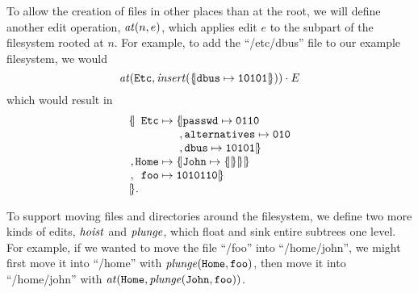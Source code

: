 To allow the creation of files in other places than at the root, we will
define another edit operation, $\mathit{at}(n,e)$, which applies edit $e$ to the
subpart of the filesystem rooted at $n$. For example, to add the
``/etc/dbus'' file to our example filesystem, we would
\[\mathit{at}(\mathtt{Etc},\mathit{insert}(\{\hspace{-2pt}|\mathtt{dbus}\mapsto\mathtt{10101}|\hspace{-2pt}\}))\cdot
E\]
which would result in
\[
\begin{array}{c@{}r@{\;}l@{\;}l}
    \Open&\Label{Etc} &\To&\Open\Label{passwd}\To\Label{0110} \\
         &            &   &\;,  \Label{alternatives}\To\Label{010} \\
         &            &   &\;,  \Label{dbus}\To\Label{10101}\Close \\
    ,    &\Label{Home}&\To&\Open\Label{John}\To\Open\Close\Close\Close \\
    ,    &\Label{foo} &\To&\Label{1010110}\Close \\
    \Close.\!\!
\end{array}
\]

To support moving files and directories around the filesystem, we
define two more kinds of edits, $\mathit{hoist}$ and $\mathit{plunge}$, which float and sink
entire subtrees one level. For example, if we wanted to move the file
``/foo'' into ``/home/john'', we might first move it into ``/home'' with
$\mathit{plunge}(\mathtt{Home},\mathtt{foo})$, then move it into ``/home/john'' with
$\mathit{at}(\mathtt{Home},\mathit{plunge}(\mathtt{John},\mathtt{foo}))$.

